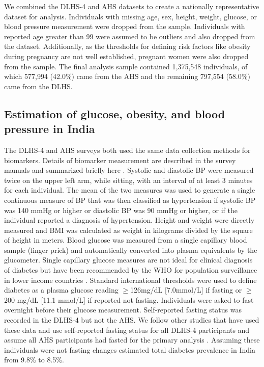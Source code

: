 \documentclass[10pt,letterpaper]{article}
\numberwithin{equation}{section}
\begin{document}
We combined the DLHS-4 and AHS datasets to create a nationally representative dataset for analysis. Individuals with missing age, sex, height, weight, glucose, or blood pressure measurement were dropped from the sample. Individuals with reported age greater than 99 were assumed to be outliers and also dropped from the dataset. Additionally, as the thresholds for defining risk factors like obesity during pregnancy are not well established, pregnant women were also dropped from the sample. The final analysis sample contained 1,375,548 individuals, of which 577,994 (\num{42.0}\%) came from the AHS and the remaining 797,554 (\num{58.0}\%) came from the DLHS.

\subsection{Estimation of glucose, obesity, and blood pressure in India}
\label{sec:glucose}
The DLHS-4 and AHS surveys both used the same data collection methods for biomarkers. Details of biomarker measurement are described in the survey manuals and summarized briefly here \cite{noauthor_annual_2014}. Systolic and diastolic BP were measured twice on the upper left arm, while sitting, with an interval of at least 3 minutes for each individual. The mean of the two measures was used to generate a single continuous measure of BP that was then classified as hypertension if systolic BP was 140 mmHg or higher or diastolic BP was 90 mmHg or higher, or if the individual reported a diagnosis of hypertension. Height and weight were directly measured and BMI was calculated as weight in kilograms divided by the square of height in meters. Blood glucose was measured from a single capillary blood sample (finger prick) and automatically converted into plasma equivalents by the glucometer. Single capillary glucose measures are not ideal for clinical diagnosis of diabetes but have been recommended by the WHO for population surveillance in lower income countries \cite{diabetesWHO}. Standard international thresholds were used to define diabetes as a plasma glucose reading $\geq$126mg/dL [\num{7.0}mmol/L] if fasting or $\geq$200 mg/dL [\num{11.1} mmol/L] if reported not fasting. Individuals were asked to fast overnight before their glucose measurement. Self-reported fasting status was recorded in the DLHS-4 but not the AHS. We follow other studies that have used these data and use self-reported fasting status for all DLHS-4 participants and assume all AHS participants had fasted for the primary analysis \cite{geldsetzer2018,bischops2019}.  Assuming these individuals were not fasting changes estimated total diabetes prevalence in India from \num{9.8}\% to \num{8.5}\%.
\end{document}

